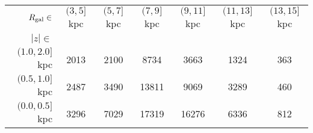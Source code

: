 \begin{tabular}{r|cccccc}
\hline\hline
$R_{\rm gal}\in$ & $(3, 5]$ kpc & $(5, 7]$ kpc & $(7, 9]$ kpc & $(9, 11]$ kpc & $(11, 13]$ kpc & $(13, 15]$ kpc \\
$|z|\in$ &  &  &  &  &  &  \\
\hline
$(1.0, 2.0]$ kpc & 2013 & 2100 & 8734 & 3663 & 1324 & 363 \\
$(0.5, 1.0]$ kpc & 2487 & 3490 & 13811 & 9069 & 3289 & 460 \\
$(0.0, 0.5]$ kpc & 3296 & 7029 & 17319 & 16276 & 6336 & 812 \\
\hline
\end{tabular}
